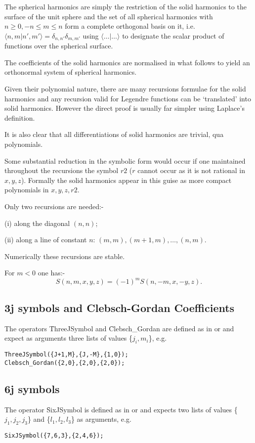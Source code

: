 The spherical harmonics are simply the restriction of the solid
harmonics to the surface of the unit sphere and the set of all
spherical harmonics with $n \geq 0, -n \leq m \leq n$ form a complete
orthogonal basis on it, i.e.\ $\langle n,m | n',m' \rangle
= \delta_{n,n'} \delta_{m,m'}$ using $\langle \ldots | \ldots \rangle$
to designate the scalar product of functions over the spherical
surface.

The coefficients of the solid harmonics are normalised in what
follows to yield an orthonormal system of spherical harmonics.

Given their polynomial nature, there are many recursions formulae
for the solid harmonics and any recursion valid for Legendre functions
can be `translated' into solid harmonics. However the direct proof is
usually far simpler using Laplace's definition.

It is also clear that all differentiations of solid harmonics are
trivial, qua polynomials.

Some substantial reduction in the symbolic form would occur if one
maintained throughout the recursions the symbol $r2$ ($r$ cannot occur
as it is not rational in $x,y,z$). Formally the solid harmonics appear
in this guise as more compact polynomials in $x,y,z,r2$.

Only two recursions are needed:-

(i) along the diagonal $(n,n)$;

(ii) along a line of constant $n$: $(m,m),(m+1,m),\ldots,(n,m)$.

Numerically these recursions are stable.

For $m < 0$ one has:-
\[ S(n,m,x,y,z) = (-1)^m S(n,-m,x,-y,z). \]

\subsection{3j symbols and Clebsch-Gordan Coefficients}
\hypertarget{CLEBSCHG}{}
The operators \f{ThreeJSymbol} and \f{Clebsch\_Gordan} are defined as
in \cite{LandoltBoernstein:68} or \cite{Edmonds:57} and expect as arguments
three lists of values \{$j_i,m_i$\}, e.g.
\begin{verbatim}
ThreeJSymbol({J+1,M},{J,-M},{1,0});
Clebsch_Gordan({2,0},{2,0},{2,0});
\end{verbatim}

\subsection{6j symbols }
The operator \f{SixJSymbol} is defined as
in \cite{LandoltBoernstein:68} or \cite{Edmonds:57} and
expects two lists of values \{$j_1,j_2,j_3$\} and
\{$l_1,l_2,l_3$\} as arguments, e.g.
\begin{verbatim}
SixJSymbol({7,6,3},{2,4,6});
\end{verbatim}

